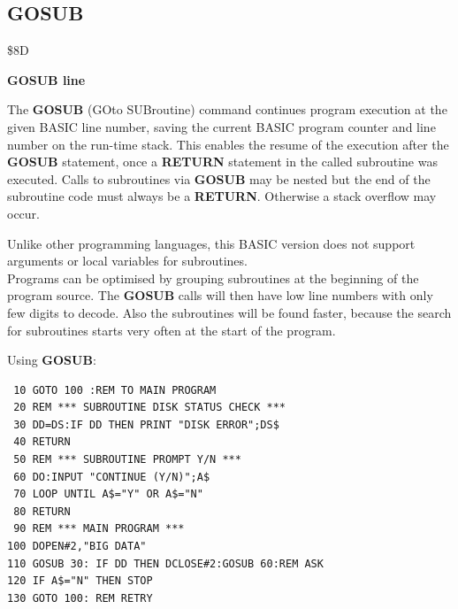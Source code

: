 
\newpage
\subsection{GOSUB}
\begin{description}[leftmargin=2cm,style=nextline]
\item [Token:] \$8D
\item [Format:] {\bf GOSUB line}
\item [Usage:] The {\bf GOSUB} (GOto SUBroutine)
               command continues program
               execution at the given BASIC line number,
               saving the current BASIC program counter
               and line number on the run-time stack.
               This enables the resume of the execution after
               the {\bf GOSUB} statement, once a {\bf RETURN}
               statement in the called subroutine was executed.
               Calls to subroutines via {\bf GOSUB} may be nested
               but the end of the subroutine code must always
               be a {\bf RETURN}. Otherwise a stack overflow
               may occur.

\item [Remarks:] Unlike other programming languages, this BASIC
               version does not support arguments or local
               variables for subroutines. \\
               Programs can be optimised by grouping subroutines
               at the beginning of the program source. The
               {\bf GOSUB} calls will then have low line numbers
               with only few digits to decode. Also the subroutines
               will be found faster, because the search for subroutines
               starts very often at the start of the program.
\item [Example:] Using {\bf GOSUB}:
\begin{tcolorbox}[colback=black,coltext=white]
\verbatimfont{\codefont}
\begin{verbatim}
 10 GOTO 100 :REM TO MAIN PROGRAM
 20 REM *** SUBROUTINE DISK STATUS CHECK ***
 30 DD=DS:IF DD THEN PRINT "DISK ERROR";DS$
 40 RETURN
 50 REM *** SUBROUTINE PROMPT Y/N ***
 60 DO:INPUT "CONTINUE (Y/N)";A$
 70 LOOP UNTIL A$="Y" OR A$="N"
 80 RETURN
 90 REM *** MAIN PROGRAM ***
100 DOPEN#2,"BIG DATA"
110 GOSUB 30: IF DD THEN DCLOSE#2:GOSUB 60:REM ASK
120 IF A$="N" THEN STOP
130 GOTO 100: REM RETRY
\end{verbatim}
\end{tcolorbox}
\end{description}

